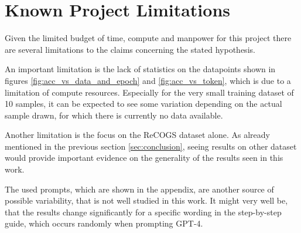 \documentclass[11pt]{article}
\begin{document}
%

    \section*{Known Project Limitations}
    Given the limited budget of time, compute and manpower for this project there are several limitations to the claims
    concerning the stated hypothesis.

    An important limitation is the lack of statistics on the datapoints shown in figures
    \ref{fig:acc_vs_data_and_epoch} and \ref{fig:acc_vs_token}, which is due to a limitation of compute resources.
    Especially for the very small training dataset of 10 samples, it can be expected to see some variation depending on
    the actual sample drawn, for which there is currently no data available.

    Another limitation is the focus on the ReCOGS dataset alone.
    As already mentioned in the previous section \ref{sec:conclusion}, seeing results on other dataset would provide
    important evidence on the generality of the results seen in this work.

    The used prompts, which are shown in the appendix, are another source of possible variability, that is not well studied in
    this work.
    It might very well be, that the results change significantly for a specific wording in the step-by-step guide, which
    occurs randomly when prompting GPT-4.
\end{document}
